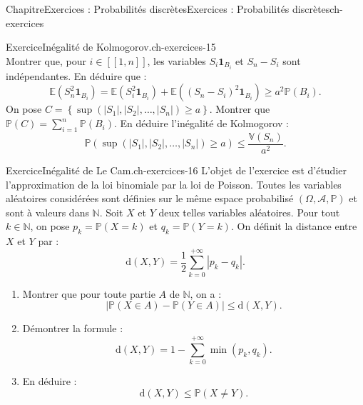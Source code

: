 \documentclass[twoside,10pt,]{book}
\numberwithin{equation}{chapter}
\newcommand{\N}{\mathbb N}
\renewcommand{\Pr}{\mathbb P}
\newcommand{\Es}{\mathbb E}
\newcommand{\Va}{\mathbb V}
\renewcommand\llbracket{[\![}
\renewcommand\rrbracket{]\!]}
\begin{document}
\begin{chapterptx}{Chapitre}{Exercices : Probabilités discrètes}{}{Exercices : Probabilités discrètes}{}{}{ch-exercices}
\begin{inlineexercise}{Exercice}{Inégalité de Kolmogorov.}{ch-exercices-15}
\begin{equation*}
\end{equation*}
%
Montrer que, pour \(i \in \llbracket 1, n \rrbracket\), les variables \(S_{i} \mathbf{1}_{B_{i}}\) et \(S_{n} - S_{i}\) sont indépendantes. En déduire que :%
\begin{equation*}
\Es(S_{n}^{2} \mathbf{1}_{B_{i}}) = \Es(S_{i}^{2} \mathbf{1}_{B_{i}}) + \Es((S_{n} - S_{i})^{2} \mathbf{1}_{B_{i}}) \geqslant a^{2} \Pr(B_{i}).
\end{equation*}
%
On pose \(C = \left\{\sup \left(\left|S_{1}\right|, \left|S_{2}\right|, \ldots, \left|S_{n}\right|\right) \geqslant a\right\}\). Montrer que \(\Pr(C) = \sum_{i=1}^{n} \Pr(B_{i})\).%
En déduire l'inégalité de Kolmogorov :%
\begin{equation*}
\Pr\left(\sup \left(\left|S_{1}\right|, \left|S_{2}\right|, \ldots, \left|S_{n}\right|\right) \geqslant a\right) \leqslant \frac{\Va(S_{n})}{a^{2}}.
\end{equation*}
%
\end{inlineexercise}%
\begin{inlineexercise}{Exercice}{Inégalité de Le Cam.}{ch-exercices-16}%
L'objet de l'exercice est d'étudier l'approximation de la loi binomiale par la loi de Poisson. Toutes les variables aléatoires considérées sont définies sur le même espace probabilisé \((\Omega, \mathcal{A}, \Pr)\) et sont à valeurs dans \(\N\).%
Soit \(X\) et \(Y\) deux telles variables aléatoires. Pour tout \(k \in \N\), on pose \(p_{k} = \Pr(X = k)\) et \(q_{k} = \Pr(Y = k)\). On définit la distance entre \(X\) et \(Y\) par :%
\begin{equation*}
\mathrm{d}(X, Y) = \frac{1}{2} \sum_{k=0}^{+\infty} \left|p_{k} - q_{k}\right|.
\end{equation*}
%
%
\begin{enumerate}[label={\arabic*.}]
\item{}Montrer que pour toute partie \(A\) de \(\N\), on a :%
\begin{equation*}
|\Pr(X \in A) - \Pr(Y \in A)| \leqslant \mathrm{d}(X, Y).
\end{equation*}
%
\item{}Démontrer la formule :%
\begin{equation*}
\mathrm{d}(X, Y) = 1 - \sum_{k=0}^{+\infty} \min(p_{k}, q_{k}).
\end{equation*}
%
\item{}En déduire :%
\begin{equation*}
\mathrm{d}(X, Y) \leqslant \Pr(X \neq Y).
\end{equation*}
%
\end{enumerate}

\end{inlineexercise}
\end{chapterptx}
\end{document}
